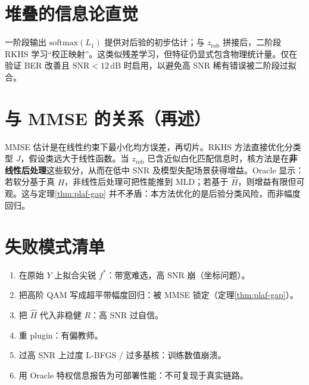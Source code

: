 \section{堆叠的信息论直觉}

一阶段输出 $\mathrm{softmax}(L_1)$ 提供对后验的初步估计；与 $z_{\mathrm{rob}}$ 拼接后，二阶段 RKHS 学习“校正映射”。这类似残差学习，但特征仍显式包含物理统计量。仅在验证 BER 改善且 $\mathrm{SNR}<12\,\mathrm{dB}$ 时启用，以避免高 SNR 稀有错误被二阶段过拟合。

\section{与 MMSE 的关系（再述）}

MMSE 估计是在线性约束下最小化均方误差，再切片。RKHS 方法直接优化分类型 $J$，假设类远大于线性函数。当 $z_{\mathrm{rob}}$ 已含近似白化匹配信息时，核方法是在\textbf{非线性后处理}这些软分，从而在低中 SNR 及模型失配场景获得增益。Oracle 显示：若软分基于真 $H$，非线性后处理可把性能推到 MLD；若基于 $\hat H$，则增益有限但可观。这与定理\ref{thm:plaf-gap} 并不矛盾：本方法优化的是后验分类风险，而非幅度回归。

\section{失败模式清单}

\begin{enumerate}[leftmargin=2em]
  \item 在原始 $Y$ 上拟合尖锐 $f^*$：带宽难选，高 SNR 崩（坐标问题）。
  \item 把高阶 QAM 写成超平带幅度回归：被 MMSE 锁定（定理\ref{thm:plaf-gap}）。
  \item 把 $\hat H$ 代入非稳健 $R$：高 SNR 过自信。
  \item 重 plugin：有偏教师。
  \item 过高 SNR 上过度 L-BFGS / 过多基核：训练数值崩溃。
  \item 用 Oracle 特权信息报告为可部署性能：不可复现于真实链路。
\end{enumerate}
